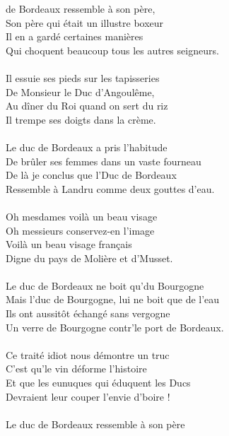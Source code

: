 
 de Bordeaux ressemble à son père,
\\Son père qui était un illustre boxeur
\\Il en a gardé certaines manières
\\Qui choquent beaucoup tous les autres seigneurs.
\\\\Il essuie ses pieds sur les tapisseries
\\De Monsieur le Duc d'Angoulême,
\\Au dîner du Roi quand on sert du riz
\\Il trempe ses doigts dans la crème.
\\\\Le duc de Bordeaux a pris l'habitude
\\De brûler ses femmes dans un vaste fourneau
\\De là je conclus que l'Duc de Bordeaux
\\Ressemble à Landru comme deux gouttes d'eau.
\\\\Oh mesdames voilà un beau visage
\\Oh messieurs conservez-en l'image
\\Voilà un beau visage français
\\Digne du pays de Molière et d'Musset.
\\\\Le duc de Bordeaux ne boit qu'du Bourgogne
\\Mais l'duc de Bourgogne, lui ne boit que de l'eau
\\Ils ont aussitôt échangé sans vergogne
\\Un verre de Bourgogne contr'le port de Bordeaux.
\\\\Ce traité idiot nous démontre un truc
\\C'est qu'le vin déforme l'histoire
\\Et que les eunuques qui éduquent les Ducs
\\Devraient leur couper l'envie d'boire !
\\\\Le duc de Bordeaux ressemble à son père
